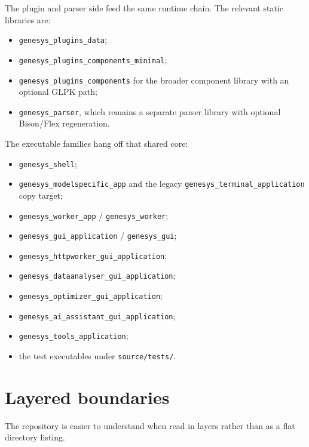 The plugin and parser side feed the same runtime chain. The relevant static
libraries are:
\begin{itemize}
\item \texttt{genesys\_plugins\_data};
\item \texttt{genesys\_plugins\_components\_minimal};
\item \texttt{genesys\_plugins\_components} for the broader component
library with an optional GLPK path;
\item \texttt{genesys\_parser}, which remains a separate parser library with
optional Bison/Flex regeneration.
\end{itemize}

The executable families hang off that shared core:
\begin{itemize}
\item \texttt{genesys\_shell};
\item \texttt{genesys\_modelspecific\_app} and the legacy
\texttt{genesys\_terminal\_application} copy target;
\item \texttt{genesys\_worker\_app} / \texttt{genesys\_worker};
\item \texttt{genesys\_gui\_application} / \texttt{genesys\_gui};
\item \texttt{genesys\_httpworker\_gui\_application};
\item \texttt{genesys\_dataanalyser\_gui\_application};
\item \texttt{genesys\_optimizer\_gui\_application};
\item \texttt{genesys\_ai\_assistant\_gui\_application};
\item \texttt{genesys\_tools\_application};
\item the test executables under \texttt{source/tests/}.
\end{itemize}

\section{Layered boundaries}
\label{sec:repo-layered-boundaries}

The repository is easier to understand when read in layers rather than as a
flat directory listing.

